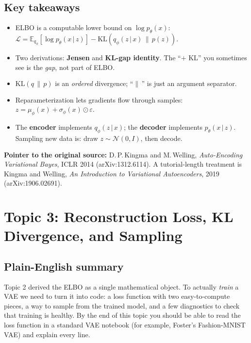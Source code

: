 \documentclass[11pt]{article}
\newcommand{\E}{\mathbb{E}}
\newcommand{\KL}{\mathrm{KL}}
\newcommand{\given}{\,\vert\,}
\theoremstyle{remark}
\begin{document}
\subsection{Key takeaways}
\begin{itemize}[leftmargin=1.2em]
  \item ELBO is a computable lower bound on $\log p_\theta(x)$: \quad
  $\displaystyle \mathcal L=\E_{q_\phi}[\log p_\theta(x\given z)] - \KL(q_\phi(z\given x)\,\|\,p(z))$.
  \item Two derivations: \textbf{Jensen} and \textbf{KL-gap identity}. The ``$+$ KL'' you sometimes see is the \emph{gap}, not part of ELBO.
  \item $\KL(q\,\|\,p)$ is an \emph{ordered} divergence; ``$\|\,$'' is just an argument separator.
  \item Reparameterization lets gradients flow through samples: $z=\mu_\phi(x)+\sigma_\phi(x)\odot\varepsilon$.
  \item The \textbf{encoder} implements $q_\phi(z\given x)$; the \textbf{decoder} implements $p_\theta(x\given z)$. Sampling new data is: draw $z\sim\mathcal N(0,I)$, then decode.
\end{itemize}

\noindent\textbf{Pointer to the original source:} D.\,P.\,Kingma and M.\,Welling, \textit{Auto-Encoding Variational Bayes}, ICLR 2014 (arXiv:1312.6114). A tutorial-length treatment is Kingma and Welling, \textit{An Introduction to Variational Autoencoders}, 2019 (arXiv:1906.02691).

\section{Topic 3: Reconstruction Loss, KL Divergence, and Sampling}

\subsection{Plain-English summary}
Topic 2 derived the ELBO as a single mathematical object. To actually \emph{train} a VAE we need to turn it into code: a loss function with two easy-to-compute pieces, a way to sample from the trained model, and a few diagnostics to check that training is healthy. By the end of this topic you should be able to read the loss function in a standard VAE notebook (for example, Foster's Fashion-MNIST VAE) and explain every line.
\end{document}
